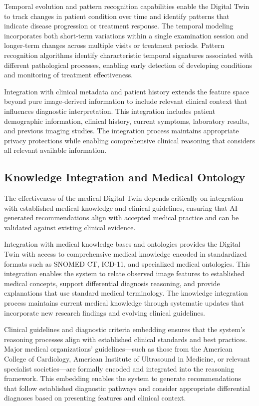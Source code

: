 Temporal evolution and pattern recognition capabilities enable the Digital Twin to track changes in patient condition over time and identify patterns that indicate disease progression or treatment response. The temporal modeling incorporates both short-term variations within a single examination session and longer-term changes across multiple visits or treatment periods. Pattern recognition algorithms identify characteristic temporal signatures associated with different pathological processes, enabling early detection of developing conditions and monitoring of treatment effectiveness.

Integration with clinical metadata and patient history extends the feature space beyond pure image-derived information to include relevant clinical context that influences diagnostic interpretation. This integration includes patient demographic information, clinical history, current symptoms, laboratory results, and previous imaging studies. The integration process maintains appropriate privacy protections while enabling comprehensive clinical reasoning that considers all relevant available information.

\subsection{Knowledge Integration and Medical Ontology}

The effectiveness of the medical Digital Twin depends critically on integration with established medical knowledge and clinical guidelines, ensuring that AI-generated recommendations align with accepted medical practice and can be validated against existing clinical evidence.

Integration with medical knowledge bases and ontologies provides the Digital Twin with access to comprehensive medical knowledge encoded in standardized formats such as SNOMED CT, ICD-11, and specialized medical ontologies. This integration enables the system to relate observed image features to established medical concepts, support differential diagnosis reasoning, and provide explanations that use standard medical terminology. The knowledge integration process maintains current medical knowledge through systematic updates that incorporate new research findings and evolving clinical guidelines.

Clinical guidelines and diagnostic criteria embedding ensures that the system's reasoning processes align with established clinical standards and best practices. Major medical organizations' guidelines—such as those from the American College of Cardiology, American Institute of Ultrasound in Medicine, or relevant specialist societies—are formally encoded and integrated into the reasoning framework. This embedding enables the system to generate recommendations that follow established diagnostic pathways and consider appropriate differential diagnoses based on presenting features and clinical context.

